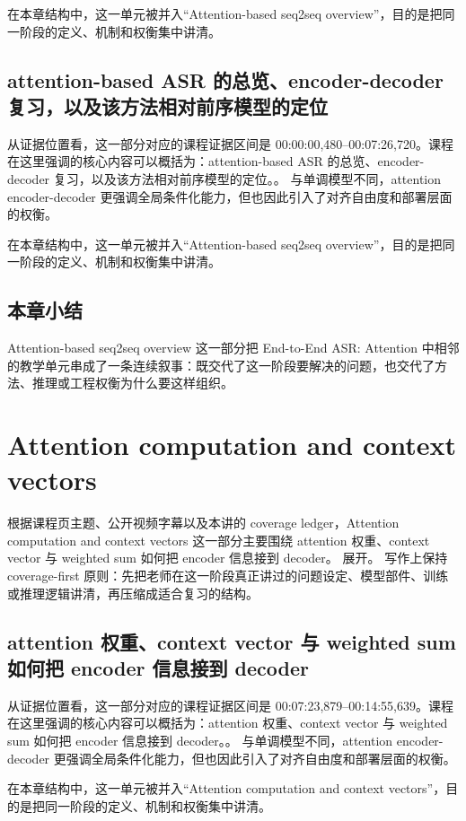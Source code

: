 \documentclass[a4paper]{article}
\begin{document}
在本章结构中，这一单元被并入“Attention-based seq2seq overview”，目的是把同一阶段的定义、机制和权衡集中讲清。

\subsection{attention-based ASR 的总览、encoder-decoder 复习，以及该方法相对前序模型的定位}
从证据位置看，这一部分对应的课程证据区间是 00:00:00,480--00:07:26,720。课程在这里强调的核心内容可以概括为：attention-based ASR 的总览、encoder-decoder 复习，以及该方法相对前序模型的定位。。
与单调模型不同，attention encoder-decoder 更强调全局条件化能力，但也因此引入了对齐自由度和部署层面的权衡。

在本章结构中，这一单元被并入“Attention-based seq2seq overview”，目的是把同一阶段的定义、机制和权衡集中讲清。

\subsection{本章小结}
Attention-based seq2seq overview 这一部分把 End-to-End ASR: Attention 中相邻的教学单元串成了一条连续叙事：既交代了这一阶段要解决的问题，也交代了方法、推理或工程权衡为什么要这样组织。

\section{Attention computation and context vectors}
根据课程页主题、公开视频字幕以及本讲的 coverage ledger，Attention computation and context vectors 这一部分主要围绕 attention 权重、context vector 与 weighted sum 如何把 encoder 信息接到 decoder。 展开。
写作上保持 coverage-first 原则：先把老师在这一阶段真正讲过的问题设定、模型部件、训练或推理逻辑讲清，再压缩成适合复习的结构。

\subsection{attention 权重、context vector 与 weighted sum 如何把 encoder 信息接到 decoder}
从证据位置看，这一部分对应的课程证据区间是 00:07:23,879--00:14:55,639。课程在这里强调的核心内容可以概括为：attention 权重、context vector 与 weighted sum 如何把 encoder 信息接到 decoder。。
与单调模型不同，attention encoder-decoder 更强调全局条件化能力，但也因此引入了对齐自由度和部署层面的权衡。

在本章结构中，这一单元被并入“Attention computation and context vectors”，目的是把同一阶段的定义、机制和权衡集中讲清。
\end{document}
